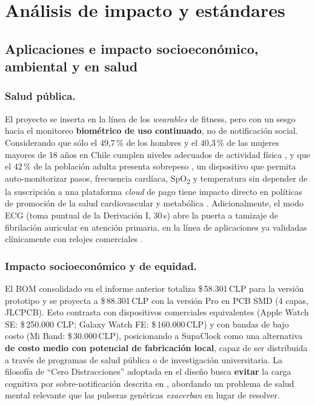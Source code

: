 \documentclass[letterpaper,11pt]{article}
\begin{document}
\section{Análisis de impacto y estándares}
\label{sec:impacto}

\subsection{Aplicaciones e impacto socioeconómico, ambiental y en salud}
\subsubsection{Salud pública.} El proyecto se inserta en la línea de los \textit{wearables} de
fitness, pero con un sesgo hacia el monitoreo \textbf{biométrico de uso continuado}, no de
notificación social. Considerando que sólo el 49,7\,\% de los hombres y el 40,3\,\% de las
mujeres mayores de 18 años en Chile cumplen niveles adecuados de actividad física \cite{encuesta_af, obesidad_chile},
y que el 42\,\% de la población adulta presenta sobrepeso \cite{encuesta_af, obesidad_chile}, un dispositivo que
permita auto-monitorizar pasos, frecuencia cardíaca, SpO\textsubscript{2} y temperatura sin
depender de la suscripción a una plataforma \textit{cloud} de pago tiene impacto directo en
políticas de promoción de la salud cardiovascular y metabólica \cite{minsalwearables}.
Adicionalmente, el modo ECG (toma puntual de la Derivación I, 30\,s) abre la puerta a tamizaje
de fibrilación auricular en atención primaria, en la línea de aplicaciones ya validadas
clínicamente con relojes comerciales \cite{Shin2019}.

\subsubsection{Impacto socioeconómico y de equidad.} El BOM consolidado en el informe anterior
totaliza \$\,58.301\,CLP para la versión prototipo y se proyecta a \$\,88.301\,CLP con la versión
Pro en PCB SMD (4 capas, JLCPCB). Esto contrasta con dispositivos comerciales equivalentes (Apple Watch SE: \$\,250.000
CLP; Galaxy Watch FE: \$\,160.000\,CLP) y con bandas de bajo costo (Mi Band: \$\,30.000\,CLP),
posicionando a SupaClock como una alternativa \textbf{de costo medio con potencial de
fabricación local}, capaz de ser distribuida a través de programas de salud pública o de
investigación universitaria. La filosofía de ``Cero Distracciones'' adoptada en el diseño
busca \textbf{evitar} la carga cognitiva por sobre-notificación descrita en
\cite{Kushlev2016, Pielot2014}, abordando un problema de salud mental relevante que las
pulseras genéricas \textit{exacerban} en lugar de resolver.
\end{document}
